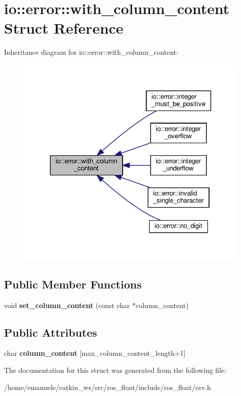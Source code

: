 \hypertarget{structio_1_1error_1_1with__column__content}{}\section{io\+:\+:error\+:\+:with\+\_\+column\+\_\+content Struct Reference}
\label{structio_1_1error_1_1with__column__content}


Inheritance diagram for io\+:\+:error\+:\+:with\+\_\+column\+\_\+content\+:\nopagebreak
\begin{figure}[H]
\begin{center}
\leavevmode
\includegraphics[width=324pt]{structio_1_1error_1_1with__column__content__inherit__graph}
\end{center}
\end{figure}
\subsection*{Public Member Functions}
\begin{DoxyCompactItemize}
\item 
\mbox{\label{structio_1_1error_1_1with__column__content_ae7375310dc02425cb3cc4115b3ac8d6a}} 
void {\bfseries set\+\_\+column\+\_\+content} (const char $\ast$column\+\_\+content)
\end{DoxyCompactItemize}
\subsection*{Public Attributes}
\begin{DoxyCompactItemize}
\item 
\mbox{\label{structio_1_1error_1_1with__column__content_a8587779769fbfb40155abb362137a523}} 
char {\bfseries column\+\_\+content} \mbox{[}max\+\_\+column\+\_\+content\+\_\+length+1\mbox{]}
\end{DoxyCompactItemize}


The documentation for this struct was generated from the following file\+:\begin{DoxyCompactItemize}
\item 
/home/emanuele/catkin\+\_\+ws/src/ros\+\_\+float/include/ros\+\_\+float/csv.\+h\end{DoxyCompactItemize}
